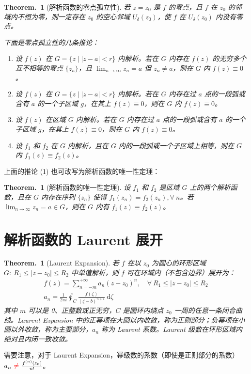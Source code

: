 \documentclass[UTF8]{report}
\theoremstyle{MyLineTheoremStyle} %
\theoremstyle{MyBlockTheoremStyle} %
\newtheorem{BlockTheorem}[LineTheorem]{Theorem.\,} %
\theoremstyle{MySubsubsectionStyle} %
\begin{document}
\begin{BlockTheorem}[解析函数的零点孤立性]\label{解析函数的零点孤立性}
若 $z = z_0$ 是 $f$ 的零点，且 $f$ 在 $z_0$ 的邻域内不恒为零，则一定存在 $z_0$ 的空心邻域 $U_{\delta}(z_0)$，使 $f$ 在 $U_{\delta}(z_0)$ 内没有零点。

下面是零点孤立性的几条推论：
\begin{enumerate}
\item 设 $f(z)$ 在 $G = \{z \mid | z - a | < r\}$ 内解析。若在 $G$ 内存在 $f(z)$ 的无穷多个互不相等的零点 $\{z_n\}$，且 $\lim_{n \to \infty} z_n = a$ 但 $z_n \ne a$，则在 $G$ 内 $f(z) \equiv 0$。
\item 设 $f(z)$ 在 $G = \{z \mid | z - a | < r\}$ 内解析。若在 $G$ 内存在过 $a$ 点的一段弧或含有 $a$ 的一个子区域 $g$，在其上 $f(z) \equiv 0$，则在 $G$ 内 $f(z) \equiv 0$。
\item 设 $f(z)$ 在区域 $G$ 内解析。若在 $G$ 内存在过 $a$ 点的一段弧或含有 $a$ 的一个子区域 $g$，在其上 $f(z) \equiv 0$，则在 $G$ 内 $f(z) \equiv 0$。
\item 设 $f_1$ 和 $f_2$ 在 $G$ 内解析，且在 $G$ 内的一段弧或一个子区域上相等，则在 $G$ 内 $f_1(z) \equiv f_2(z)$。
\end{enumerate}
\end{BlockTheorem}

上面的推论 (1) 也可改写为解析函数的唯一性定理：
\begin{BlockTheorem}[解析函数的唯一性定理]\label{解析函数的唯一性定理}
    设 $f_1$ 和 $f_2$ 是区域 $G$ 上的两个解析函数，且在 $G$ 内存在序列 $\{z_n\}$ 使得 $f_1(z_n) = f_2(z_n), \forall\ n$。若 $\lim_{n \to \infty} z_n = a \in G$，则在 $G$ 内有 $f_1(z) \equiv f_2(z)$。
\end{BlockTheorem}

\section{解析函数的 Laurent 展开}

\begin{BlockTheorem}[Laurent Expansion]\label{Laurent Expansion}
若 $f$ 在以 $z_0$ 为圆心的环形区域 $G:\  R_1 \leqslant | z - z_0 | \leqslant R_2$ 中单值解析，则 $f$ 可在环域内（不包含边界）展开为：
\begin{gather}
f(z) = \sum_{n = -m}^{+ \infty} a_n (z - z_0)^n,\quad  \forall\ R_1 \leqslant | z - z_0 | \leqslant R_2
\\ 
a_n = \displaystyle \frac{1}{2 \pi i}\oint_{C}\frac{f(\zeta)}{(\zeta - b)^{n+1}}\ \mathrm{d}\zeta
\end{gather}
其中 $m$ 可以是 0、正整数或正无穷，$C$ 是圆环内绕点 $z_0$ 一周的任意一条闭合曲线。Laurent Expansion 中的正幂项在大圆以内收敛，称为正则部分；负幂项在小圆以外收敛，称为主要部分，$a_n$ 称为 Laurent 系数。Laurent 级数在环形区域内绝对且内闭一致收敛。
\end{BlockTheorem}
需要注意，对于 Laurent Expansion，幂级数的系数{\color{red}（即使是正则部分的系数）} $a_n {\ \color{red} \ne\ } \frac{f^{(n)}(z_0)}{n!}$。
\end{document}
